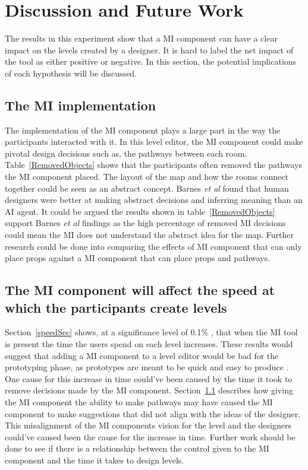 \documentclass[journal]{IEEEtran}
\begin{document}
\section{Discussion and Future Work}
The results in this experiment show that a MI component can have a clear impact on the levels created by a designer. It is hard to label the net impact of the tool as either positive or negative. In this section, the potential implications of each hypothesis will be discussed. 

\subsection{The MI implementation}\label{implementation}
 The implementation of the MI component plays a large part in the way the participants interacted with it. In this level editor, the MI component could make pivotal design decisions such as, the pathways between each room. Table~\ref{RemovedObjects} shows that the participants often removed the pathways the MI component placed. The layout of the map and how the rooms connect together could be seen as an abstract concept. Barnes \textit{et al}\cite{barnes2015designing} found that human designers were better at making abstract decisions and inferring meaning than an AI agent. It could be argued the results shown in table~\ref{RemovedObjects} support Barnes \textit{et al}\cite{barnes2015designing} findings as the high percentage of removed MI decisions could mean the MI does not understand the abstract idea for the map. Further research could be done into comparing the effects of MI component that can only place props against a MI component that can place props and pathways.

\subsection{The MI component will affect the speed at which the participants create levels}
Section~\ref{speedSec} shows, at a significance level of 0.1\% , that when the MI tool is present the time the users spend on each level increases. These results would suggest that adding a MI component to a level editor would be bad for the prototyping phase, as prototypes are meant to be quick and easy to produce \cite{budde1992prototyping}. One cause for this increase in time could've been caused by the time it took to remove decisions made by the MI component. Section~\ref{implementation} describes how giving the MI component the ability to make pathways may have caused the MI component to make suggestions that did not align with the ideas of the designer. This misalignment of the MI components vision for the level and the designers could've caused been the cause for the increase in time. Further work should be done to see if there is a relationship between the control given to the MI component and the time it takes to design levels.
\end{document}
